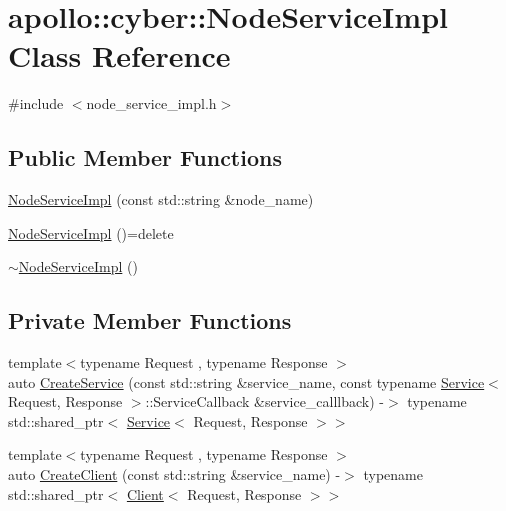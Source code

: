 \hypertarget{classapollo_1_1cyber_1_1NodeServiceImpl}{\section{apollo\-:\-:cyber\-:\-:Node\-Service\-Impl Class Reference}
\label{classapollo_1_1cyber_1_1NodeServiceImpl}
}


{\ttfamily \#include $<$node\-\_\-service\-\_\-impl.\-h$>$}

\subsection*{Public Member Functions}
\begin{DoxyCompactItemize}
\item 
\hyperlink{classapollo_1_1cyber_1_1NodeServiceImpl_ac518c6b95388e87a0243c53e4cdab402}{Node\-Service\-Impl} (const std\-::string \&node\-\_\-name)
\item 
\hyperlink{classapollo_1_1cyber_1_1NodeServiceImpl_a559f15a34d47e87450f8366242f699c2}{Node\-Service\-Impl} ()=delete
\item 
\hyperlink{classapollo_1_1cyber_1_1NodeServiceImpl_a80eba07a61bf286d23b547e8ad5fe07a}{$\sim$\-Node\-Service\-Impl} ()
\end{DoxyCompactItemize}
\subsection*{Private Member Functions}
\begin{DoxyCompactItemize}
\item 
{\footnotesize template$<$typename Request , typename Response $>$ }\\auto \hyperlink{classapollo_1_1cyber_1_1NodeServiceImpl_a617b7fee0b96d3115e70143745004935}{Create\-Service} (const std\-::string \&service\-\_\-name, const typename \hyperlink{classapollo_1_1cyber_1_1Service}{Service}$<$ Request, Response $>$\-::Service\-Callback \&service\-\_\-calllback) -\/$>$ typename std\-::shared\-\_\-ptr$<$ \hyperlink{classapollo_1_1cyber_1_1Service}{Service}$<$ Request, Response $>$$>$
\item 
{\footnotesize template$<$typename Request , typename Response $>$ }\\auto \hyperlink{classapollo_1_1cyber_1_1NodeServiceImpl_ae5e61b7a241ded9d370fef484abb0064}{Create\-Client} (const std\-::string \&service\-\_\-name) -\/$>$ typename std\-::shared\-\_\-ptr$<$ \hyperlink{classapollo_1_1cyber_1_1Client}{Client}$<$ Request, Response $>$$>$
\end{DoxyCompactItemize}
